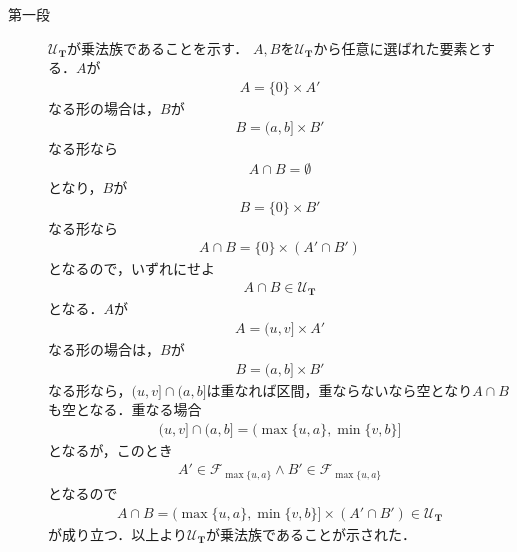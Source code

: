 	\begin{sketch}\mbox{}
		\begin{description}
			\item[第一段] $\mathscr{U}_{\mathbf{T}}$が乗法族であることを示す．
				$A,B$を$\mathscr{U}_{\mathbf{T}}$から任意に選ばれた要素とする．$A$が
				\begin{align}
					A = \{0\} \times A'
				\end{align}
				なる形の場合は，$B$が
				\begin{align}
					B = (a,b] \times B'
				\end{align}
				なる形なら
				\begin{align}
					A \cap B = \emptyset
				\end{align}
				となり，$B$が
				\begin{align}
					B = \{0\} \times B'
				\end{align}
				なる形なら
				\begin{align}
					A \cap B = \{0\} \times (A' \cap B')
				\end{align}
				となるので，いずれにせよ
				\begin{align}
					A \cap B \in \mathscr{U}_{\mathbf{T}}
				\end{align}
				となる．$A$が
				\begin{align}
					A = (u,v] \times A'
				\end{align}
				なる形の場合は，$B$が
				\begin{align}
					B = (a,b] \times B'
				\end{align}
				なる形なら，$(u,v] \cap (a,b]$は重なれば区間，重ならないなら空となり$A \cap B$も空となる．重なる場合
				\begin{align}
					(u,v] \cap (a,b] = (\max{\{u,a\}}, \min{\{v,b\}}]
				\end{align}
				となるが，このとき
				\begin{align}
					A' \in \mathscr{F}_{\max{\{u,a\}}} \wedge B' \in \mathscr{F}_{\max{\{u,a\}}}
				\end{align}
				となるので
				\begin{align}
					A \cap B = (\max{\{u,a\}}, \min{\{v,b\}}] \times (A' \cap B') \in \mathscr{U}_{\mathbf{T}}
				\end{align}
				が成り立つ．以上より$\mathscr{U}_{\mathbf{T}}$が乗法族であることが示された．
			

\end{description}
\end{sketch}
